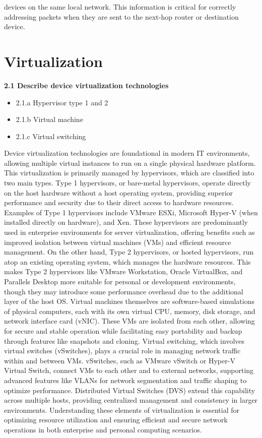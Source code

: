 \documentclass{article}
\begin{document}
devices on the same local network. This information is critical for correctly addressing packets when they are sent to the next-hop router or destination device.\\

\section{Virtualization}
\textbf{2.1 Describe device virtualization technologies}
\begin{itemize}
\item 2.1.a Hypervisor type 1 and 2
\item 2.1.b Virtual machine
\item 2.1.c Virtual switching
\end{itemize}
	
	Device virtualization technologies are foundational in modern IT environments, allowing multiple virtual instances to run on a single physical hardware platform. This virtualization is primarily managed by hypervisors, which are classified into two main types. Type 1 hypervisors, or bare-metal hypervisors, operate directly on the host hardware without a host operating system, providing superior performance and security due to their direct access to hardware resources. Examples of Type 1 hypervisors include VMware ESXi, Microsoft Hyper-V (when installed directly on hardware), and Xen. These hypervisors are predominantly used in enterprise environments for server virtualization, offering benefits such as improved isolation between virtual machines (VMs) and efficient resource management. On the other hand, Type 2 hypervisors, or hosted hypervisors, run atop an existing operating system, which manages the hardware resources. This makes Type 2 hypervisors like VMware Workstation, Oracle VirtualBox, and Parallels Desktop more suitable for personal or development environments, though they may introduce some performance overhead due to the additional layer of the host OS. Virtual machines themselves are software-based simulations of physical computers, each with its own virtual CPU, memory, disk storage, and network interface card (vNIC). These VMs are isolated from each other, allowing for secure and stable operation while facilitating easy portability and backup through features like snapshots and cloning. Virtual switching, which involves virtual switches (vSwitches), plays a crucial role in managing network traffic within and between VMs. vSwitches, such as VMware vSwitch or Hyper-V Virtual Switch, connect VMs to each other and to external networks, supporting advanced features like VLANs for network segmentation and traffic shaping to optimize performance. Distributed Virtual Switches (DVS) extend this capability across multiple hosts, providing centralized management and consistency in larger environments. Understanding these elements of virtualization is essential for optimizing resource utilization and ensuring efficient and secure network operations in both enterprise and personal computing scenarios.\\
\end{document}
